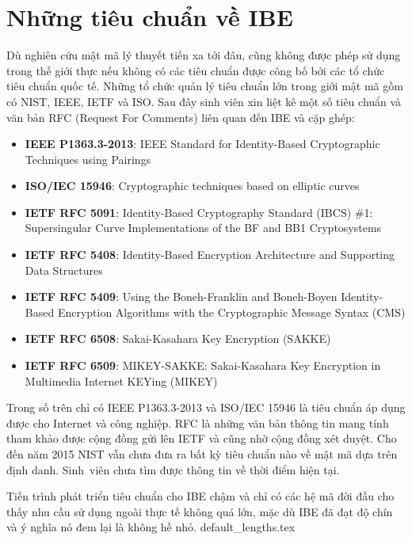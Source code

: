 \documentclass[class=report, crop=false]{standalone}
\begin{document}
	\section{Những tiêu chuẩn về IBE}
		Dù nghiên cứu mật mã lý thuyết tiến xa tới đâu, cũng không được phép sử dụng trong thế giới thực nếu không có các tiêu chuẩn được công bố bởi các tổ chức tiêu chuẩn quốc tế. Những tổ chức quản lý tiêu chuẩn lớn trong giới mật mã gồm có NIST, IEEE, IETF và ISO. Sau đây sinh viên xin liệt kê một số tiêu chuẩn và văn bản RFC (Request For Comments) liên quan đến IBE và cặp ghép:
		\vspace{-0.5\baselineskip}
		\begin{itemize}[leftmargin=1cm]
			\item \textbf{IEEE P1363.3-2013}: IEEE Standard for Identity-Based Cryptographic Techniques using Pairings
			\item \textbf{ISO/IEC 15946}: Cryptographic techniques based on elliptic curves
			\item \textbf{IETF RFC 5091}: Identity-Based Cryptography Standard (IBCS) \#1: Supersingular Curve Implementations of the BF and BB1 Cryptosystems
			\item \textbf{IETF RFC 5408}: Identity-Based Encryption Architecture and Supporting Data Structures
			\item \textbf{IETF RFC 5409}: Using the Boneh-Franklin and Boneh-Boyen Identity-Based Encryption Algorithms with the Cryptographic Message Syntax (CMS)
			\item \textbf{IETF RFC 6508}: Sakai-Kasahara Key Encryption (SAKKE)
			\item \textbf{IETF RFC 6509}: MIKEY-SAKKE: Sakai-Kasahara Key Encryption in Multimedia Internet KEYing (MIKEY)
		\end{itemize}
		
		Trong số trên chỉ có IEEE P1363.3-2013 và ISO/IEC 15946 là tiêu chuẩn áp dụng được cho Internet và công nghiệp. RFC là những văn bản thông tin mang tính tham khảo được cộng đồng gửi lên IETF và cũng nhờ cộng đồng xét duyệt. Cho đến năm 2015 NIST vẫn chưa đưa ra bất kỳ tiêu chuẩn nào về mật mã dựa trên định danh. Sinh~viên chưa tìm được thông tin về thời điểm hiện tại.

		Tiến trình phát triển tiêu chuẩn cho IBE chậm và chỉ có các hệ mã đời đầu cho thấy nhu cầu sử dụng ngoài thực tế không quá lớn, mặc dù IBE đã đạt độ chín và ý nghĩa nó đem lại là không hề nhỏ.
	\newpage
	{default_lengths.tex}
\end{document}
